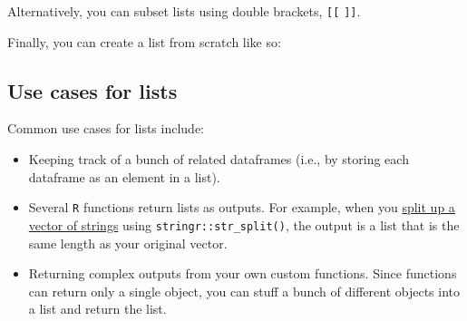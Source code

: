 \documentclass[
]{book}
\newenvironment{Shaded}{\begin{snugshade}}{\end{snugshade}}
\newcommand{\DecValTok}[1]{\textcolor[rgb]{0.00,0.00,0.81}{#1}}
\newcommand{\KeywordTok}[1]{\textcolor[rgb]{0.13,0.29,0.53}{\textbf{#1}}}
\newcommand{\NormalTok}[1]{#1}
\newcommand{\OperatorTok}[1]{\textcolor[rgb]{0.81,0.36,0.00}{\textbf{#1}}}
\newcommand{\StringTok}[1]{\textcolor[rgb]{0.31,0.60,0.02}{#1}}
\begin{document}
Alternatively, you can subset lists using double brackets, \texttt{{[}{[}} \texttt{{]}{]}}.

\begin{Shaded}
\end{Shaded}

Finally, you can create a list from scratch like so:

\begin{Shaded}
\end{Shaded}

\hypertarget{use-cases-for-lists}{%
\subsection*{Use cases for lists}\label{use-cases-for-lists}}

Common use cases for lists include:

\begin{itemize}
\item
  Keeping track of a bunch of related dataframes (i.e., by storing each dataframe as an element in a list).
\item
  Several \texttt{R} functions return lists as outputs. For example, when you \protect\hyperlink{text}{split up a vector of strings} using \texttt{stringr::str\_split()}, the output is a list that is the same length as your original vector.
\item
  Returning complex outputs from your own custom functions. Since functions can return only a single object, you can stuff a bunch of different objects into a list and return the list.
\end{itemize}
\end{document}
